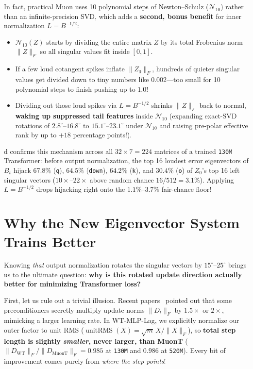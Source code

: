 \documentclass[11pt]{article}
\newcommand{\Nten}{\mathcal{N}_{10}}
\newcommand{\unitrms}{\operatorname{unitRMS}}
\newcommand{\mname}[1]{#1}
\begin{document}
In fact, practical \mname{Muon} uses 10 polynomial steps of Newton--Schulz ($\Nten$) rather than an infinite-precision SVD, which adds a \textbf{second, bonus benefit} for inner normalization $L = B^{-1/2}$:
\begin{itemize}[leftmargin=1.5em, itemsep=2pt, topsep=2pt]
  \item $\Nten(Z)$ starts by dividing the entire matrix $Z$ by its total Frobenius norm $\|Z\|_F$ so all singular values fit inside $[0, 1]$.
  \item If a few loud cotangent spikes inflate $\|Z_0\|_F$, hundreds of quieter singular values get divided down to tiny numbers like $0.002$---too small for 10 polynomial steps to finish pushing up to $1.0$!
  \item Dividing out those loud spikes via $L = B^{-1/2}$ shrinks $\|Z\|_F$ back to normal, \textbf{waking up suppressed tail features} inside $\Nten$ (expanding exact-SVD rotations of $2.8^\circ\text{--}16.8^\circ$ to $\mathbf{15.1^\circ\text{--}23.1^\circ}$ under $\Nten$ and raising pre-polar effective rank by up to $+18$ percentage points!).
\end{itemize}

d confirms this mechanism across all $32 \times 7 = 224$ matrices of a trained \texttt{130M} Transformer: before output normalization, the top 16 loudest error eigenvectors of $B_t$ hijack $\mathbf{67.8\%}$ (\texttt{q}), $\mathbf{64.5\%}$ (\texttt{down}), $\mathbf{64.2\%}$ (\texttt{k}), and $\mathbf{30.4\%}$ (\texttt{o}) of $Z_0$'s top 16 left singular vectors ($10\times\text{--}22\times$ above random chance $16/512 = 3.1\%$). Applying $L = B^{-1/2}$ drops hijacking right onto the $\mathbf{1.1\%\text{--}3.7\%}$ fair-chance floor!

\section{Why the New Eigenvector System Trains Better}
\label{sec:why_better}

Knowing \emph{that} output normalization rotates the singular vectors by $15^\circ\text{--}25^\circ$ brings us to the ultimate question: \textbf{why is this rotated update direction actually better for minimizing Transformer loss?}

First, let us rule out a trivial illusion. Recent papers~\citep{shumaylov2026freon, goyal2026spectrally} pointed out that some preconditioners secretly multiply update norms $\|D_t\|_F$ by $1.5\times$ or $2\times$, mimicking a larger learning rate.
In \mname{WT-MLP-Lag}, we explicitly normalize our outer factor to unit RMS ($\unitrms(X) = \sqrt{m}\,X / \|X\|_F$), so \textbf{total step length is slightly \emph{smaller}, never larger, than \mname{MuonT}} ($\|D_{\mathrm{WT}}\|_F / \|D_{\mathrm{MuonT}}\|_F = \mathbf{0.985}$ at \texttt{130M} and $\mathbf{0.986}$ at \texttt{520M}). Every bit of improvement comes purely from \emph{where the step points}!
\end{document}
